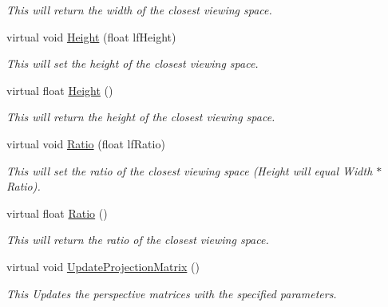 \begin{DoxyCompactItemize}
\begin{DoxyCompactList}\small\item\em This will return the width of the closest viewing space. \end{DoxyCompactList}\item 
\hypertarget{classc_perspective_control_a83d8c55d372776fad7c3f50e491fed0c}{
virtual void \hyperlink{classc_perspective_control_a83d8c55d372776fad7c3f50e491fed0c}{Height} (float lfHeight)}
\label{classc_perspective_control_a83d8c55d372776fad7c3f50e491fed0c}

\begin{DoxyCompactList}\small\item\em This will set the height of the closest viewing space. \end{DoxyCompactList}\item 
\hypertarget{classc_perspective_control_a86ce18eca9d81e0b3efa11585c582f64}{
virtual float \hyperlink{classc_perspective_control_a86ce18eca9d81e0b3efa11585c582f64}{Height} ()}
\label{classc_perspective_control_a86ce18eca9d81e0b3efa11585c582f64}

\begin{DoxyCompactList}\small\item\em This will return the height of the closest viewing space. \end{DoxyCompactList}\item 
\hypertarget{classc_perspective_control_ab6a66dcb1252a08b6bd5de5ab7ef54dc}{
virtual void \hyperlink{classc_perspective_control_ab6a66dcb1252a08b6bd5de5ab7ef54dc}{Ratio} (float lfRatio)}
\label{classc_perspective_control_ab6a66dcb1252a08b6bd5de5ab7ef54dc}

\begin{DoxyCompactList}\small\item\em This will set the ratio of the closest viewing space (Height will equal Width $\ast$ Ratio). \end{DoxyCompactList}\item 
\hypertarget{classc_perspective_control_a04c6bbe06bfc7830c5111317bdd14f2e}{
virtual float \hyperlink{classc_perspective_control_a04c6bbe06bfc7830c5111317bdd14f2e}{Ratio} ()}
\label{classc_perspective_control_a04c6bbe06bfc7830c5111317bdd14f2e}

\begin{DoxyCompactList}\small\item\em This will return the ratio of the closest viewing space. \end{DoxyCompactList}\item 
\hypertarget{classc_perspective_control_a21f71c817289e0f250dbe9fa83f269bd}{
virtual void \hyperlink{classc_perspective_control_a21f71c817289e0f250dbe9fa83f269bd}{UpdateProjectionMatrix} ()}
\label{classc_perspective_control_a21f71c817289e0f250dbe9fa83f269bd}

\begin{DoxyCompactList}\small\item\em This Updates the perspective matrices with the specified parameters. \end{DoxyCompactList}\end{DoxyCompactItemize}
